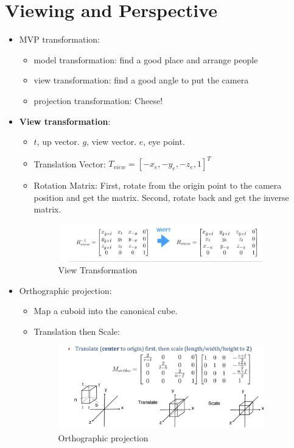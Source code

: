 \documentclass{article}
\begin{document}
\section{Viewing and Perspective}
\begin{itemize}
    \item MVP transformation:
\begin{itemize}
    \item model transformation: find a good place and arrange people
    \item view transformation: find a good angle to put the camera
    \item projection transformation: Cheese!
\end{itemize}
\item 
\textbf{View transformation}:
\begin{itemize}
\item $t$, up vector. $g$, view vector. $e$, eye point.
\item Translation Vector: $T_{view}=[-x_e,-y_e,-z_e,1]^T$
\item Rotation Matrix: First, rotate from the origin point to the camera position and get the matrix. Second, rotate back and get the inverse matrix.
\begin{figure}[H]
    \centering
    \includegraphics[width=0.9\textwidth]{imgs/view_trans.jpeg}
    \caption{View Transformation}

\end{figure}
\end{itemize}

\item Orthographic projection:
\begin{itemize}
    \item Map a cuboid into the canonical cube.
    \item Translation then Scale:
    \begin{figure}[H]
    \centering
    \includegraphics[width=0.9\textwidth]{imgs/ortho_proj.jpeg}
    \caption{Orthographic projection}


\end{figure}
\end{itemize}
\end{itemize}
\end{document}
